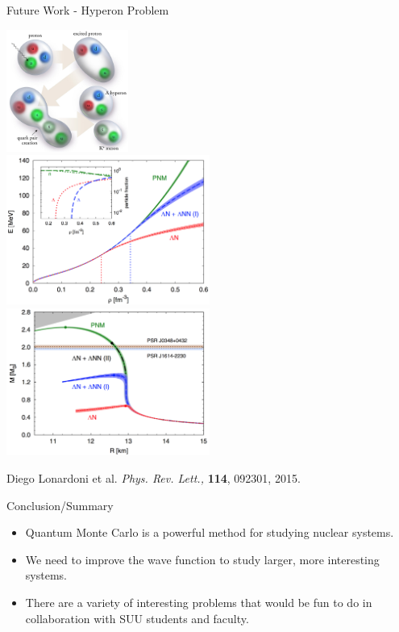 \documentclass{beamer}
\begin{document}
\begin{frame}{Future Work - Hyperon Problem}
\begin{center}
   \includegraphics[width=0.3\textwidth]{figures/lambda.jpg}
   ~\\
   \includegraphics[width=0.5\textwidth]{figures/ns_eos.png}
   ~
   \includegraphics[width=0.5\textwidth]{figures/mr.png}
\end{center}
{\tiny Diego Lonardoni et al. \textit{Phys. Rev. Lett.,} \textbf{114}, 092301, 2015.}
\end{frame}

\begin{frame}{Conclusion/Summary}
\begin{itemize}
   \item Quantum Monte Carlo is a powerful method for studying nuclear systems.
   \item We need to improve the wave function to study larger, more interesting systems.
   \item There are a variety of interesting problems that would be fun to do in collaboration with SUU students and faculty.
\end{itemize}
\end{frame}
\end{document}
